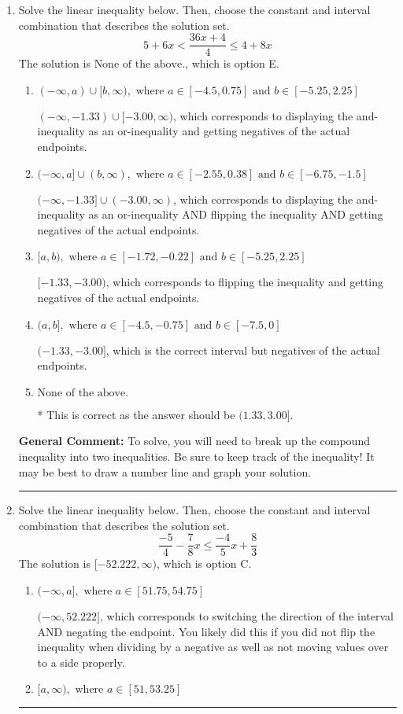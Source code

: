 \documentclass{extbook}[14pt]
\newcommand{\litem}[1]{\item #1

\rule{\textwidth}{0.4pt}}
\begin{document}
\begin{enumerate}\litem{
Solve the linear inequality below. Then, choose the constant and interval combination that describes the solution set.
\[ 5 + 6 x < \frac{36 x + 4}{4} \leq 4 + 8 x \]The solution is \( \text{None of the above.} \), which is option E.\begin{enumerate}[label=\Alph*.]
\item \( (-\infty, a) \cup [b, \infty), \text{ where } a \in [-4.5, 0.75] \text{ and } b \in [-5.25, 2.25] \)

$(-\infty, -1.33) \cup [-3.00, \infty)$, which corresponds to displaying the and-inequality as an or-inequality and getting negatives of the actual endpoints.
\item \( (-\infty, a] \cup (b, \infty), \text{ where } a \in [-2.55, 0.38] \text{ and } b \in [-6.75, -1.5] \)

$(-\infty, -1.33] \cup (-3.00, \infty)$, which corresponds to displaying the and-inequality as an or-inequality AND flipping the inequality AND getting negatives of the actual endpoints.
\item \( [a, b), \text{ where } a \in [-1.72, -0.22] \text{ and } b \in [-5.25, 2.25] \)

$[-1.33, -3.00)$, which corresponds to flipping the inequality and getting negatives of the actual endpoints.
\item \( (a, b], \text{ where } a \in [-4.5, -0.75] \text{ and } b \in [-7.5, 0] \)

$(-1.33, -3.00]$, which is the correct interval but negatives of the actual endpoints.
\item \( \text{None of the above.} \)

* This is correct as the answer should be $(1.33, 3.00]$.
\end{enumerate}

\textbf{General Comment:} To solve, you will need to break up the compound inequality into two inequalities. Be sure to keep track of the inequality! It may be best to draw a number line and graph your solution.
}
\litem{
Solve the linear inequality below. Then, choose the constant and interval combination that describes the solution set.
\[ \frac{-5}{4} - \frac{7}{8} x \leq \frac{-4}{5} x + \frac{8}{3} \]The solution is \( [-52.222, \infty) \), which is option C.\begin{enumerate}[label=\Alph*.]
\item \( (-\infty, a], \text{ where } a \in [51.75, 54.75] \)

 $(-\infty, 52.222]$, which corresponds to switching the direction of the interval AND negating the endpoint. You likely did this if you did not flip the inequality when dividing by a negative as well as not moving values over to a side properly.
\item \( [a, \infty), \text{ where } a \in [51, 53.25] \)


\end{enumerate}}
\end{enumerate}
\end{document}

